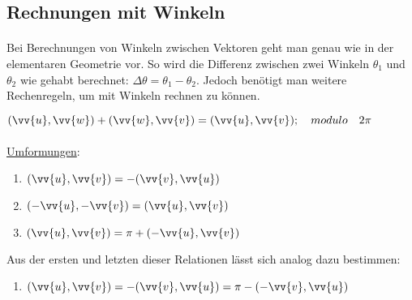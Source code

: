\documentclass[main.tex]{subfiles}
\begin{document}
    \subsection{Rechnungen mit Winkeln}

        \paragraph{} Bei Berechnungen von Winkeln zwischen Vektoren geht man genau wie in der elementaren Geometrie vor.
         So wird die Differenz zwischen zwei Winkeln $\theta_{1}$ und $\theta_{2}$ wie gehabt berechnet: $\Delta\theta = \theta_{1} - \theta_{2}$.
         Jedoch benötigt man weitere Rechenregeln, um mit Winkeln rechnen zu können.
        \\
        \begin{Theorem}
            $(\vv{u},\vv{w})+(\vv{w},\vv{v})=(\vv{u},\vv{v});\quad modulo\quad 2\pi$ \\\\
            \underline{Umformungen}: \\
            \begin{enumerate}[(1)]
                \item $(\vv{u},\vv{v})=-(\vv{v},\vv{u})\quad$
                \item $(-\vv{u},-\vv{v})=(\vv{u},\vv{v})\quad$
                \item $(\vv{u},\vv{v})=\pi+(-\vv{u},\vv{v})\quad$
            \end{enumerate}
                Aus der ersten und letzten dieser Relationen lässt sich analog dazu bestimmen:
            \begin{enumerate}[(4)]
                \item $(\vv{u},\vv{v})=-(\vv{v},\vv{u})=\pi-(-\vv{v},\vv{u})\quad$
            \end{enumerate}
        \end{Theorem}

        \vspace{1cm}
\end{document}
